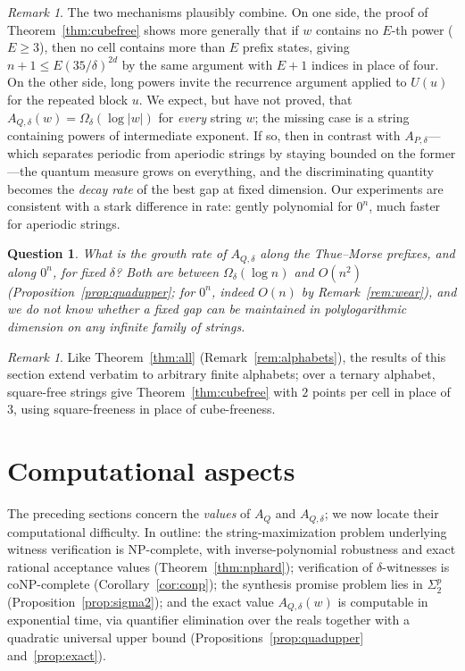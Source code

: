\documentclass[11pt]{amsart}
\newtheorem{question}[theorem]{Question}
\theoremstyle{definition}
\theoremstyle{remark}
\newtheorem{remark}[theorem]{Remark}
\newcommand{\AQ}{A_Q}
\begin{document}
\begin{remark}\label{rem:allwords}
The two mechanisms plausibly combine. On one side, the proof of
Theorem~\ref{thm:cubefree} shows more generally that if $w$ contains
no $E$-th power ($E\ge3$), then no cell contains more than $E$ prefix
states, giving $n+1\le E(35/\delta)^{2d}$ by the same argument with
$E+1$ indices in place of four. On the other side, long powers invite
the recurrence argument applied to $U(u)$ for the repeated block
$u$. We expect, but have not proved, that
$A_{Q,\delta}(w)=\Omega_\delta(\log|w|)$ for \emph{every} string $w$;
the missing case is a string containing powers of intermediate
exponent. If so, then in contrast with $A_{P,\delta}$---which
separates periodic from aperiodic strings by staying bounded on the
former---the quantum measure grows on everything, and the
discriminating quantity becomes the \emph{decay rate} of the best gap
at fixed dimension. Our experiments are consistent with a stark
difference in rate: gently polynomial for $0^n$, much faster for
aperiodic strings.
\end{remark}

\begin{question}\label{q:rate}
What is the growth rate of $A_{Q,\delta}$ along the Thue--Morse
prefixes, and along $0^n$, for fixed $\delta$? Both are between
$\Omega_\delta(\log n)$ and $O(n^2)$
(Proposition~\ref{prop:quadupper}; for $0^n$, indeed $O(n)$ by
Remark~\ref{rem:wear}), and we do not know whether a fixed gap can be
maintained in polylogarithmic dimension on any infinite family of
strings.
\end{question}

\begin{remark}
Like Theorem~\ref{thm:all} (Remark~\ref{rem:alphabets}), the results
of this section extend verbatim to arbitrary finite alphabets; over a
ternary alphabet, square-free strings give Theorem~\ref{thm:cubefree}
with $2$ points per cell in place of $3$, using square-freeness in
place of cube-freeness.
\end{remark}

\section{Computational aspects}\label{sec:complexity}

The preceding sections concern the \emph{values} of $\AQ$ and
$A_{Q,\delta}$; we now locate their computational difficulty. In
outline: the string-maximization problem underlying witness
verification is NP-complete, with inverse-polynomial robustness and
exact rational acceptance values (Theorem~\ref{thm:nphard});
verification of $\delta$-witnesses is coNP-complete
(Corollary~\ref{cor:conp}); the synthesis promise problem lies in
$\Sigma_2^p$ (Proposition~\ref{prop:sigma2}); and the exact value
$A_{Q,\delta}(w)$ is computable in exponential time, via quantifier
elimination over the reals together with a quadratic universal upper
bound (Propositions~\ref{prop:quadupper} and~\ref{prop:exact}).
\end{document}
